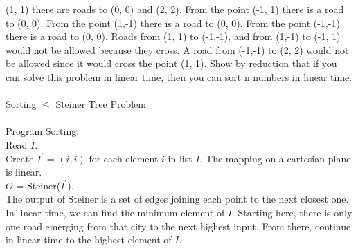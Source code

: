 \documentclass[10pt]{article}
\newcommand{\tab}{\hspace*{2em}}
\begin{document}
		(1, 1) there are roads to (0, 0) and (2, 2). From the point (-1, 1) there is a road to (0, 0). From the
		point (1,-1) there is a road to (0, 0). From the point (-1,-1) there is a road to (0, 0).
		Roads from (1, 1) to (-1,-1), and from (1,-1) to (-1, 1) would not be allowed because they cross. A
		road from (-1,-1) to (2, 2) would not be allowed since it would cross the point (1, 1).
		Show by reduction that if you can solve this problem in linear time, then you can sort n numbers in
		linear time.\\
		\\
		Sorting $\leq$ Steiner Tree Problem\\
		\\
		Program Sorting:\\
		\tab Read $I$.\\
		\tab Create $I^\prime$ = $(i,i)$ for each element $i$ in list $I$. The mapping on a cartesian plane is linear.\\
		\tab $O$ = Steiner($I^\prime$).\\
		\tab The output of Steiner is a set of edges joining each point to the next closest one.\\
		\tab In linear time, we can find the minimum element of $I$. Starting here, there is only one road
			emerging from that city to the next highest input. From there, continue in linear time to the
			highest element of $I$.
\end{document}
